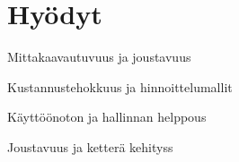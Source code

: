 \chapter{Hyödyt} \label{Hyödyt}

Mittakaavautuvuus ja joustavuus

Kustannustehokkuus ja hinnoittelumallit

Käyttöönoton ja hallinnan helppous

Joustavuus ja ketterä kehityss


